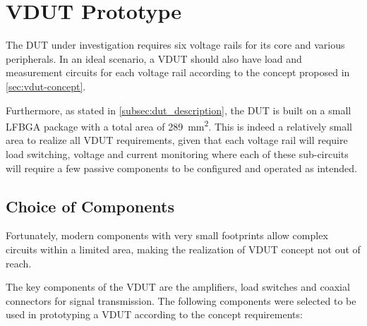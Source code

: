 

\section{\acs{VDUT} Prototype}
\label{sec:vdut-prototype}

The \ac{DUT} under investigation requires six voltage rails
for its core and various peripherals.
In an ideal scenario, a \ac{VDUT} should also have load and measurement circuits
for each voltage rail according to the concept proposed in
\autoref{sec:vdut-concept}.

Furthermore, as stated in \autoref{subsec:dut_description}, the \ac{DUT} is
built on a small \ac{LFBGA} package with a total area of
\SI{289}{\milli\meter\squared}.
This is indeed a relatively small area to realize all \ac{VDUT} requirements,
given that each voltage rail will require load switching, voltage and
current monitoring where each of these sub-circuits will require a few
passive components to be configured and operated as intended.

\subsection{Choice of Components}
\label{subsec:vdut-choice-of-components}

Fortunately, modern components with very small footprints allow
complex circuits within a limited area, making the realization of
\ac{VDUT} concept not out of reach.

The key components of the \ac{VDUT} are the amplifiers, load switches
and coaxial connectors for signal transmission.
The following components were selected to be used in
prototyping a \ac{VDUT} according to the concept requirements:

